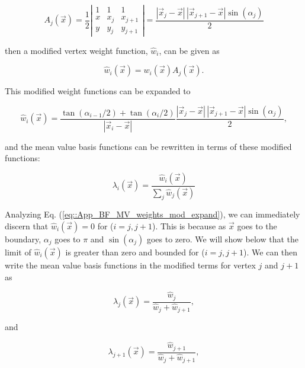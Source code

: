 \begin{equation}
\label{eq::App_BF_MV_weights_mod}
A_j (\vec{x}) = \frac{1}{2} 
\left|
\begin{array}{ccc}
1&1&1\\
x&x_j&x_{j+1}\\
y&y_j&y_{j+1}
\end{array}
\right|
= \frac{| \vec{x}_j - \vec{x} | \,| \vec{x}_{j+1} - \vec{x} | \sin (\alpha_j)}{2}
\end{equation}

\noindent then a modified vertex weight function, $\hat{w}_i$, can be given as

\begin{equation}
\label{eq::App_BF_MV_weights_mod}
\hat{w}_i (\vec{x})  = w_i (\vec{x}) A_j (\vec{x}) .
\end{equation}

\noindent This modified weight functions can be expanded to

\begin{equation}
\label{eq::App_BF_MV_weights_mod_expand}
\hat{w}_i (\vec{x})  = \frac{\tan(\alpha_{i-1} / 2) + \tan(\alpha_i / 2)}{|\vec{x}_i - \vec{x}|} \frac{| \vec{x}_j - \vec{x} | \,|\vec{x}_{j+1} - \vec{x} | \sin (\alpha_j)}{2},
\end{equation}

\noindent and the mean value basis functions can be rewritten in terms of these modified functions:

\begin{equation}
\label{eq::App_BF_MVBF_mod}
\lambda_i (\vec{x}) = \frac{\hat{w}_i  (\vec{x}) }{\sum_j \hat{w}_j  (\vec{x}) }
\end{equation}

\noindent Analyzing Eq. (\ref{eq::App_BF_MV_weights_mod_expand}), we can immediately discern that $\hat{w}_i (\vec{x}) = 0 $ for ($i=j,j+1$). This is because as $\vec{x}$ goes to the boundary, $\alpha_j$ goes to $\pi$ and $\sin (\alpha_j)$ goes to zero. We will show below that the limit of $\hat{w}_i (\vec{x}) $ is greater than zero and bounded for ($i=j,j+1$). We can then write the mean value basis functions in the modified terms for vertex $j$ and $j+1$ as 

\begin{equation}
\label{eq::App_BF_MVBF_mod_j}
\lambda_j (\vec{x}) = \frac{\hat{w}_j  }{\hat{w}_j+ \hat{w}_{j+1} } ,
\end{equation}

\noindent and

\begin{equation}
\label{eq::App_BF_MVBF_mod_j1}
\lambda_{j+1} (\vec{x}) = \frac{\hat{w}_{j+1}   }{\hat{w}_j+ \hat{w}_{j+1} } ,
\end{equation}


